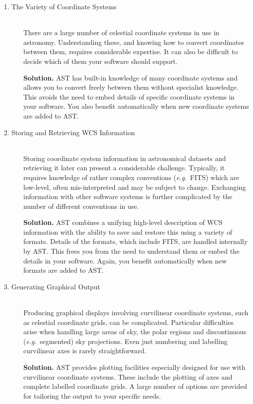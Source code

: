 \documentclass[twoside,11pt]{article}
\begin{document}
\begin{description}
\item[1. The Variety of Coordinate Systems]\mbox{}\\
There are a large number of celestial coordinate systems in use in
astronomy. Understanding these, and knowing how to convert coordinates
between them, requires considerable expertise. It can also be
difficult to decide which of them your software should support.

{\bf{Solution.}} AST has built-in knowledge of many coordinate systems
and allows you to convert freely between them without specialist
knowledge. This avoids the need to embed details of specific
coordinate systems in your software. You also benefit automatically
when new coordinate systems are added to AST.

\item[2. Storing and Retrieving WCS Information]\mbox{}\\
Storing coordinate system information in astronomical datasets and
retrieving it later can present a considerable challenge. Typically,
it requires knowledge of rather complex conventions
({\em{e.g.}}\ FITS) which are low-level, often mis-interpreted and may
be subject to change. Exchanging information with other software
systems is further complicated by the number of different conventions
in use.

{\bf{Solution.}} AST combines a unifying high-level description of WCS
information with the ability to save and restore this using a variety
of formats. Details of the formats, which include FITS, are handled
internally by AST. This frees you from the need to understand them or
embed the details in your software. Again, you benefit automatically
when new formats are added to AST.

\item[3. Generating Graphical Output]\mbox{}\\
Producing graphical displays involving curvilinear coordinate systems,
such as celestial coordinate grids, can be complicated. Particular
difficulties arise when handling large areas of sky, the polar regions
and discontinuous ({\em{e.g.}}\ segmented) sky projections.  Even just
numbering and labelling curvilinear axes is rarely straightforward.

{\bf{Solution.}} AST provides plotting facilities especially designed
for use with curvilinear coordinate systems. These include the
plotting of axes and complete labelled coordinate grids.  A large
number of options are provided for tailoring the output to your
specific needs.


\end{description}
\end{document}
